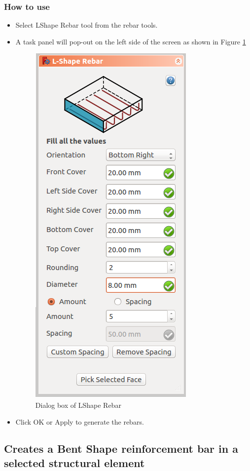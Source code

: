\subsubsection{How to use}
\begin{itemize}
\item Select LShape Rebar tool from the rebar tools.
\item A task panel will pop-out on the left side of the screen as shown in Figure \ref{lshaperebardialog}
\begin{figure}
    \centering \includegraphics[scale=0.60]{images/LShapeDialog.png}
    \caption{Dialog box of LShape Rebar}
    \label{lshaperebardialog}
\end{figure}
\item Click OK or Apply to generate the rebars.
\end{itemize}

\subsection{Creates a Bent Shape reinforcement bar in a selected structural element}
